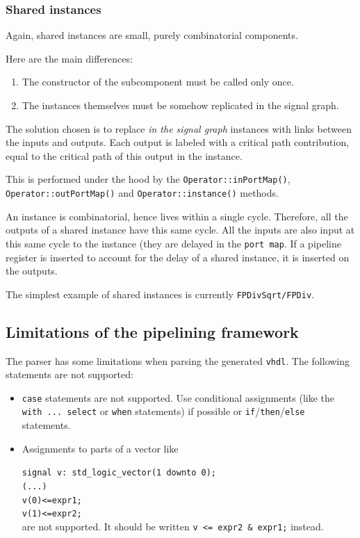 \documentclass{article}
\begin{document}
\subsubsection{Shared instances}

Again, shared instances are small, purely combinatorial components.

Here are the main differences:
\begin{enumerate}
\item The constructor of the subcomponent must be called only once.
\item The instances themselves must be somehow replicated in the signal graph.
\end{enumerate}
The solution chosen is to replace \emph{in the signal graph} instances with links between the inputs and outputs.
Each output is labeled with a critical path contribution,   equal to the critical path of this output in the instance.

This is performed under the hood by the \verb!Operator::inPortMap()!, \verb!Operator::outPortMap()! and \verb!Operator::instance()! methods.

An instance is combinatorial, hence lives within a single cycle.
Therefore, all the outputs of a shared instance have this same cycle.
All the inputs are also input at this same cycle to the instance (they are delayed in the \texttt{port map}.
If a pipeline register is inserted to account for the delay of a shared instance, it is inserted on the outputs.

The simplest example of shared instances is currently \texttt{FPDivSqrt/FPDiv}.


\subsection{Limitations of the pipelining framework}

The parser has some limitations when parsing the generated \texttt{vhdl}. The following statements are not supported:
\begin{itemize}
	\item \texttt{case} statements are not supported. Use conditional assignments (like the \texttt{with ... select} or \texttt{when} statements) if possible or \texttt{if}/\texttt{then}/\texttt{else} statements.
	\item Assignments to parts of a vector like
	
\texttt{signal v: std\_logic\_vector(1 downto 0);}\\
\texttt{(...)}\\
\texttt{v(0)<=expr1;}\\
\texttt{v(1)<=expr2;}\\
are not supported. It should be written \texttt{v <= expr2 \& expr1;} instead.
	
\end{itemize}
\end{document}
